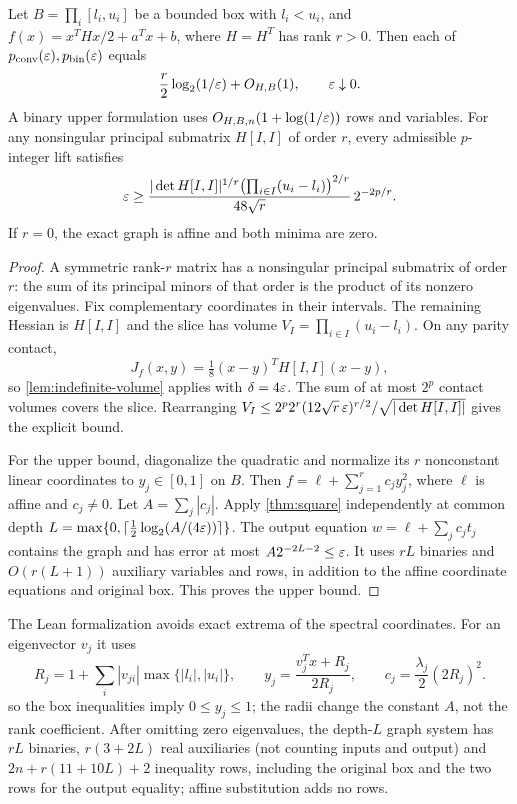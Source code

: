 \begin{theorem}\label{thm:scalar-rank}
Let $B=\prod_i[l_i,u_i]$ be a bounded box with $l_i<u_i$, and
$f(x)=x^THx/2+a^Tx+b$, where $H=H^T$ has rank $r>0$.
Then each of $p_{\mathrm{conv}}(\varepsilon),p_{\mathrm{bin}}(\varepsilon)$ equals
\begin{equation}\label{eq:scalar-law}
 \frac r2\log_2(1/\varepsilon)+O_{H,B}(1),\qquad\varepsilon\downarrow0.
\end{equation}
A binary upper formulation uses $O_{H,B,n}(1+\log(1/\varepsilon))$ rows and
variables. For any nonsingular principal submatrix $H[I,I]$ of order
$r$, every admissible $p$-integer lift satisfies
\[
 \varepsilon\ge
 \frac{|\det H[I,I]|^{1/r}\bigl(\prod_{i\in I}(u_i-l_i)\bigr)^{2/r}}
      {48\sqrt r}\,2^{-2p/r}.
\]
If $r=0$, the exact graph is affine and both minima are zero.
\end{theorem}
\begin{proof}
A symmetric rank-$r$ matrix has a nonsingular principal submatrix of
order $r$: the sum of its principal minors of that order is the product
of its nonzero eigenvalues. Fix complementary coordinates in their
intervals. The remaining Hessian is $H[I,I]$ and the slice has volume
$V_I=\prod_{i\in I}(u_i-l_i)$. On any parity contact,
\[
 J_f(x,y)=\tfrac18(x-y)^TH[I,I](x-y),
\]
so \cref{lem:indefinite-volume} applies with $\delta=4\varepsilon$.
The sum of at most $2^p$ contact volumes covers the slice. Rearranging
$V_I\le2^p2^r(12\sqrt r\,\varepsilon)^{r/2}/\sqrt{|\det H[I,I]|}$
gives the explicit bound.

For the upper bound, diagonalize the quadratic and normalize its $r$
nonconstant linear coordinates to $y_j\in[0,1]$ on $B$. Then
$f=\ell+\sum_{j=1}^r c_jy_j^2$, where $\ell$ is affine and $c_j\ne0$.
Let $A=\sum_j|c_j|$. Apply \cref{thm:square} independently at common
depth $L=\max\{0,\lceil\tfrac12\log_2(A/(4\varepsilon))\rceil\}$.
The output equation $w=\ell+\sum_jc_jt_j$ contains the graph and has
error at most $A2^{-2L-2}\le\varepsilon$. It uses $rL$ binaries and
$O(r(L+1))$ auxiliary variables and rows, in addition to the affine
coordinate equations and original box. This proves the upper bound.
\end{proof}

The Lean formalization avoids exact extrema of the spectral coordinates.
For an eigenvector $v_j$ it uses
\[
 R_j=1+\sum_i|v_{ji}|\max\{|l_i|,|u_i|\},\qquad
 y_j=\frac{v_j^Tx+R_j}{2R_j},\qquad
 c_j=\frac{\lambda_j}{2}(2R_j)^2.
\]
so the box inequalities imply $0\le y_j\le1$; the radii change the
constant $A$, not the rank coefficient. After omitting zero eigenvalues,
the depth-$L$ graph system has $rL$ binaries, $r(3+2L)$ real auxiliaries
(not counting inputs and output) and $2n+r(11+10L)+2$ inequality rows,
including the original box and the two rows for the output equality;
affine substitution adds no rows.

